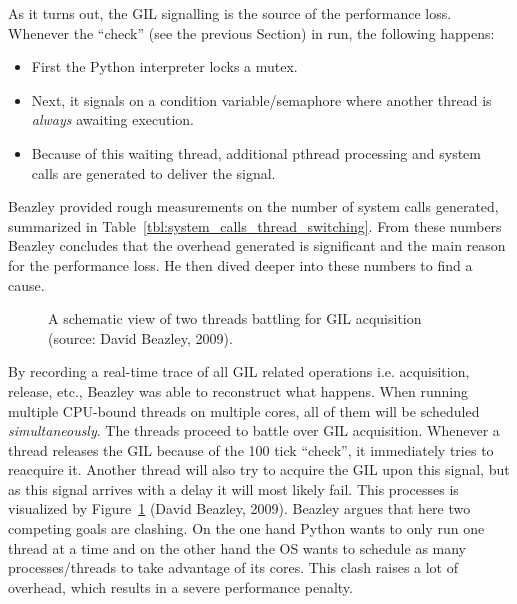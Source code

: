 As it turns out, the GIL signalling is the source of the performance loss.
Whenever the \enquote{check} (see the previous Section) in run, the following happens:

\begin{itemize}
	\item First the Python interpreter locks a mutex.
	\item Next, it signals on a condition variable/semaphore where another thread is \emph{always} awaiting execution.
	\item Because of this waiting thread, additional pthread processing and system calls are generated to deliver the signal.
\end{itemize}

Beazley provided rough measurements on the number of system calls generated, summarized in Table~\ref{tbl:system_calls_thread_switching}.
From these numbers Beazley concludes that the overhead generated is significant and the main reason for the performance loss.
He then dived deeper into these numbers to find a cause.

 \begin{figure}[h]
 	\caption{A schematic view of two threads battling for GIL acquisition (source: David Beazley, 2009).}
 	\label{fig:gil_battle_threads}
 \end{figure}

By recording a real-time trace of all GIL related operations i.e. acquisition, release, etc., Beazley was able to reconstruct what happens.
When running multiple CPU-bound threads on multiple cores, all of them will be scheduled \emph{simultaneously}.
The threads proceed to battle over GIL acquisition. 
Whenever a thread releases the GIL because of the 100 tick \enquote{check}, it immediately tries to reacquire it.
Another thread will also try to acquire the GIL upon this signal, but as this signal arrives with a delay it will most likely fail.
This processes is visualized by Figure~\ref{fig:gil_battle_threads} (David Beazley, 2009).
Beazley argues that here two competing goals are clashing.
On the one hand Python wants to only run one thread at a time and on the other hand the OS wants to schedule as many processes/threads to take advantage of its cores.
This clash raises a lot of overhead, which results in a severe performance penalty.


